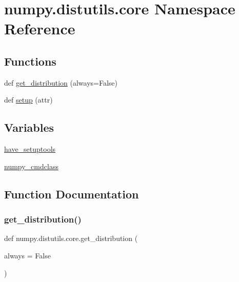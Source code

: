 \hypertarget{namespacenumpy_1_1distutils_1_1core}{}\section{numpy.\+distutils.\+core Namespace Reference}
\label{namespacenumpy_1_1distutils_1_1core}
\subsection*{Functions}
\begin{DoxyCompactItemize}
\item 
def \hyperlink{namespacenumpy_1_1distutils_1_1core_a019b14b296326cd9ae75dc0cd7d0e26d}{get\+\_\+distribution} (always=False)
\item 
def \hyperlink{namespacenumpy_1_1distutils_1_1core_a3ec7cc58a90983d37b6a28b60d67218a}{setup} (attr)
\end{DoxyCompactItemize}
\subsection*{Variables}
\begin{DoxyCompactItemize}
\item 
\hyperlink{namespacenumpy_1_1distutils_1_1core_ad6584d5c0d82347f0bc2074f5db8471c}{have\+\_\+setuptools}
\item 
\hyperlink{namespacenumpy_1_1distutils_1_1core_a7463bfdc5f92a7086c1fbaf9f509f14e}{numpy\+\_\+cmdclass}
\end{DoxyCompactItemize}


\subsection{Function Documentation}
\mbox{\label{namespacenumpy_1_1distutils_1_1core_a019b14b296326cd9ae75dc0cd7d0e26d}} 
\subsubsection{\texorpdfstring{get\+\_\+distribution()}{get\_distribution()}}
{\footnotesize\ttfamily def numpy.\+distutils.\+core.\+get\+\_\+distribution (\begin{DoxyParamCaption}\item[{}]{always = {\ttfamily False} }\end{DoxyParamCaption})}

